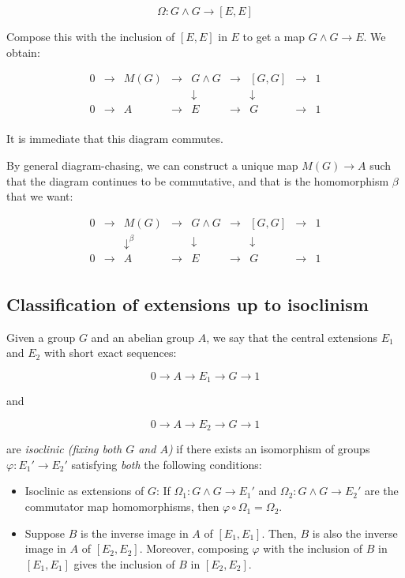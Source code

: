 $$\Omega: G \wedge G \to [E,E]$$

Compose this with the inclusion of $[E,E]$ in $E$ to get a map $G
\wedge G \to E$. We obtain:

$$\begin{array}{ccccccccc}
0 & \to & M(G) & \to & G \wedge G & \to & [G,G] & \to & 1\\
 &&               && \downarrow     &&\downarrow&& \\
0 & \to & A & \to & E & \to & G & \to & 1\\
\end{array}$$

It is immediate that this diagram commutes.

By general diagram-chasing, we can construct a unique map $M(G) \to A$
such that the diagram continues to be commutative, and that is the
homomorphism $\beta$ that we want:

$$\begin{array}{ccccccccc}
0 & \to & M(G) & \to & G \wedge G & \to & [G,G] & \to & 1\\
 &&   \downarrow^{\beta}  &&  \downarrow     && \downarrow&& \\
0 & \to & A &\to & E & \to & G & \to & 1\\
\end{array}$$

\subsection{Classification of extensions up to isoclinism}\label{sec:extensionsuptoisoclinism}

Given a group $G$ and an abelian group $A$, we say that the central
extensions $E_1$ and $E_2$ with short exact sequences:

$$0 \to A \to E_1 \to G \to 1$$

and

$$0 \to A \to E_2 \to G \to 1$$

are {\em isoclinic (fixing both $G$ and $A$)} if there exists an
isomorphism of groups $\varphi:E_1' \to E_2'$ satisfying {\em both}
the following conditions:

\begin{itemize}
\item Isoclinic as extensions of $G$: If $\Omega_1:G \wedge G \to
  E_1'$ and $\Omega_2:G \wedge G \to E_2'$ are the commutator map
  homomorphisms, then $\varphi \circ \Omega_1 = \Omega_2$.
\item Suppose $B$ is the inverse image in $A$ of $[E_1,E_1]$. Then,
  $B$ is also the inverse image in $A$ of $[E_2,E_2]$. Moreover,
  composing $\varphi$ with the inclusion of $B$ in $[E_1,E_1]$ gives
  the inclusion of $B$ in $[E_2,E_2]$.
\end{itemize}

